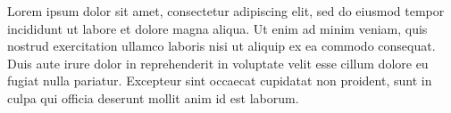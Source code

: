 Lorem ipsum dolor sit amet, consectetur adipiscing elit, sed do eiusmod tempor incididunt ut labore et dolore magna aliqua. Ut enim ad minim veniam, quis nostrud exercitation ullamco laboris nisi ut aliquip ex ea commodo consequat. Duis aute irure dolor in reprehenderit in voluptate velit esse cillum dolore eu fugiat nulla pariatur. Excepteur sint occaecat cupidatat non proident, sunt in culpa qui officia deserunt mollit anim id est laborum.

